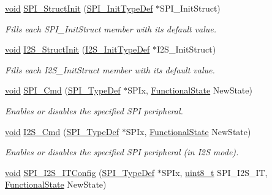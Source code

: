 \begin{DoxyCompactItemize}
\hyperlink{usb__devapi_8h_afabf60e7f57651d6d595a02c75f07cd0}{void} \hyperlink{group___s_p_i___exported___functions_ga9a0116f88cc2c4478c270f05608703f1}{S\+P\+I\+\_\+\+Struct\+Init} (\hyperlink{struct_s_p_i___init_type_def}{S\+P\+I\+\_\+\+Init\+Type\+Def} $\ast$S\+P\+I\+\_\+\+Init\+Struct)
\begin{DoxyCompactList}\small\item\em Fills each S\+P\+I\+\_\+\+Init\+Struct member with its default value. \end{DoxyCompactList}\item 
\hyperlink{usb__devapi_8h_afabf60e7f57651d6d595a02c75f07cd0}{void} \hyperlink{group___s_p_i___exported___functions_ga7470ec1d0759fdeeb42c7fe71a3b41b7}{I2\+S\+\_\+\+Struct\+Init} (\hyperlink{struct_i2_s___init_type_def}{I2\+S\+\_\+\+Init\+Type\+Def} $\ast$I2\+S\+\_\+\+Init\+Struct)
\begin{DoxyCompactList}\small\item\em Fills each I2\+S\+\_\+\+Init\+Struct member with its default value. \end{DoxyCompactList}\item 
\hyperlink{usb__devapi_8h_afabf60e7f57651d6d595a02c75f07cd0}{void} \hyperlink{group___s_p_i___exported___functions_gaa31357879a65ee1ed7223f3b9114dcf3}{S\+P\+I\+\_\+\+Cmd} (\hyperlink{struct_s_p_i___type_def}{S\+P\+I\+\_\+\+Type\+Def} $\ast$S\+P\+Ix, \hyperlink{agilefox_2library_2inc_2stm32f10x__type_8h_ac9a7e9a35d2513ec15c3b537aaa4fba1}{Functional\+State} New\+State)
\begin{DoxyCompactList}\small\item\em Enables or disables the specified S\+PI peripheral. \end{DoxyCompactList}\item 
\hyperlink{usb__devapi_8h_afabf60e7f57651d6d595a02c75f07cd0}{void} \hyperlink{group___s_p_i___exported___functions_gafe061c71bbc5b4224f3f2884dc53739e}{I2\+S\+\_\+\+Cmd} (\hyperlink{struct_s_p_i___type_def}{S\+P\+I\+\_\+\+Type\+Def} $\ast$S\+P\+Ix, \hyperlink{agilefox_2library_2inc_2stm32f10x__type_8h_ac9a7e9a35d2513ec15c3b537aaa4fba1}{Functional\+State} New\+State)
\begin{DoxyCompactList}\small\item\em Enables or disables the specified S\+PI peripheral (in I2S mode). \end{DoxyCompactList}\item 
\hyperlink{usb__devapi_8h_afabf60e7f57651d6d595a02c75f07cd0}{void} \hyperlink{group___s_p_i___exported___functions_ga17f4ef132e8ddbf94cb6b1688d181e41}{S\+P\+I\+\_\+\+I2\+S\+\_\+\+I\+T\+Config} (\hyperlink{struct_s_p_i___type_def}{S\+P\+I\+\_\+\+Type\+Def} $\ast$S\+P\+Ix, \hyperlink{_p_e___types_8h_aba7bc1797add20fe3efdf37ced1182c5}{uint8\+\_\+t} S\+P\+I\+\_\+\+I2\+S\+\_\+\+IT, \hyperlink{agilefox_2library_2inc_2stm32f10x__type_8h_ac9a7e9a35d2513ec15c3b537aaa4fba1}{Functional\+State} New\+State)

\end{DoxyCompactItemize}
